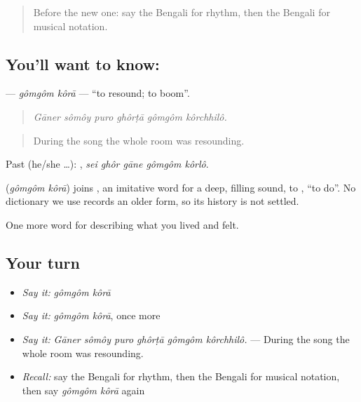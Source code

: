 \label{lesson:BN-C525-gomgom-kora}



\begin{quote}
Before the new one: say the Bengali for rhythm, then the Bengali for musical notation.
\end{quote}

\subsection*{You'll want to know:  }
\textbf{ } — \emph{gômgôm kôrā} — \textquotedblleft{}to resound; to boom\textquotedblright{}.

\begin{quote}
     
\end{quote}

\begin{quote}
\emph{Gāner sômôy puro ghôrṭā gômgôm kôrchhilô.}
\end{quote}

\begin{quote}
During the song the whole room was resounding.
\end{quote}

Past (he/she …):     , \emph{sei ghôr gāne gômgôm kôrlô}.

\begin{cousinweb}
\textbf{ } (\emph{gômgôm kôrā}) joins , an imitative word for a deep, filling sound, to , \textquotedblleft{}to do\textquotedblright{}. No dictionary we use records an older form, so its history is not settled.
\end{cousinweb}

\begin{grammarlens}[title={What you've built}]
One more word for describing what you lived and felt.
\end{grammarlens}

\subsection*{Your turn}
\begin{itemize}
\raggedright
  \item \emph{Say it:} \emph{gômgôm kôrā}
  \item \emph{Say it:} \emph{gômgôm kôrā}, once more
  \item \emph{Say it:} \emph{Gāner sômôy puro ghôrṭā gômgôm kôrchhilô.} — During the song the whole room was resounding.
  \item \emph{Recall:} say the Bengali for rhythm, then the Bengali for musical notation, then say \emph{gômgôm kôrā} again
\end{itemize}

